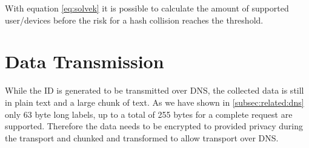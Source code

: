         With equation \ref{eq:solvek} it is possible to calculate the amount of supported user/devices before the risk for a hash collision reaches the threshold.
\newpage



\section{Data Transmission}
\label{sec:software_design:tx}
%
    While the ID is generated to be transmitted over DNS, the collected data is still in plain text and a large chunk of text. As we have shown in \ref{subsec:related:dns} only 63 byte long labels, up to a total of 255 bytes for a complete request are supported.
    Therefore the data needs to be encrypted to provided privacy during the transport and chunked and transformed to allow transport over DNS.\\
